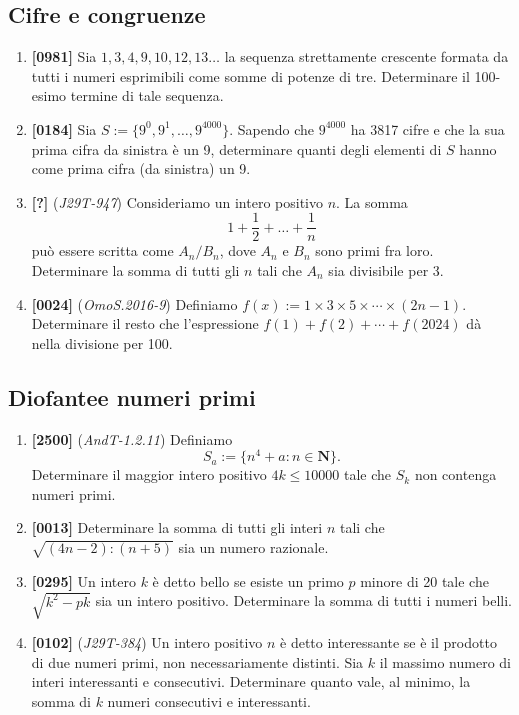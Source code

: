 \documentclass[10pt]{article}
\begin{document}
\subsection{Cifre e congruenze}
\begin{enumerate}
    \item \textbf{[0981]} Sia $1,3,4,9,10,12,13\dots$ la sequenza strettamente crescente formata da tutti i numeri esprimibili come somme di potenze di tre. Determinare il 100-esimo termine di tale sequenza.

    \item \textbf{[0184]} Sia $S:=\{9^0, 9^1,\dots, 9^{4000} \}$. Sapendo che $9^{4000}$ ha 3817 cifre e che la sua prima cifra da sinistra è un 9, determinare quanti degli elementi di $S$ hanno come prima cifra (da sinistra) un 9.

    \item \textbf{[?]} (\textit{J29T-947}) Consideriamo un intero positivo $n$. La somma
    \begin{equation*}
        1+\frac{1}{2}+\dots+\frac{1}{n}
    \end{equation*}
    può essere scritta come $A_n/B_n$, dove $A_n$ e $B_n$ sono primi fra loro. Determinare la somma di tutti gli $n$ tali che $A_n$ sia divisibile per 3.

    \item \textbf{[0024]} (\textit{OmoS.2016-9}) Definiamo $f(x):=1\times 3\times 5\times \cdots \times (2n-1)$. Determinare il resto che l'espressione $f(1)+f(2)+\cdots+f(2024)$ dà nella divisione per 100.
    
\end{enumerate}

\subsection{Diofantee numeri primi}
\begin{enumerate}
    \item \textbf{[2500]} (\textit{AndT-1.2.11}) Definiamo
    \begin{equation*}
        S_a:=\{ n^4+a : n\in \mathbf{N} \}.
    \end{equation*}
    Determinare il maggior intero positivo $4k\le 10000$ tale che $S_k$ non contenga numeri primi.

    \item \textbf{[0013]} Determinare la somma di tutti gli interi $n$ tali che $\sqrt{(4n-2):(n+5)}$ sia un numero razionale.

    \item \textbf{[0295]} Un intero $k$ è detto bello se esiste un primo $p$ minore di 20 tale che $\sqrt {k^2-pk}$ sia un intero positivo. Determinare la somma di tutti i numeri belli.

    \item \textbf{[0102]} (\textit{J29T-384}) Un intero positivo $n$ è detto interessante se è il prodotto di due numeri primi, non necessariamente distinti. Sia $k$ il massimo numero di interi interessanti e consecutivi. Determinare quanto vale, al minimo, la somma di $k$ numeri consecutivi e interessanti.
\end{enumerate}
\end{document}
